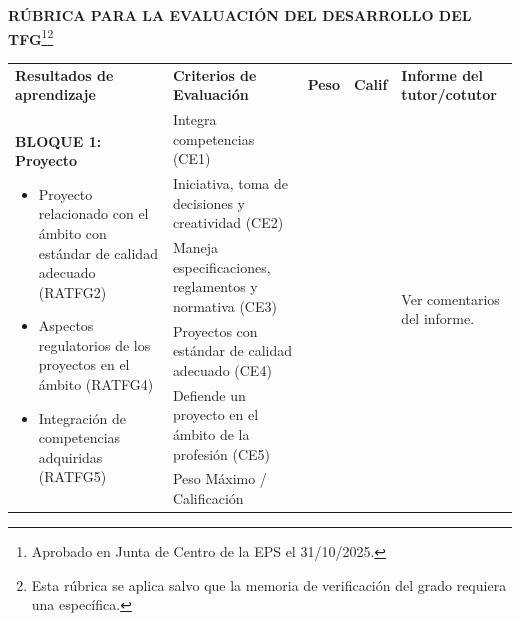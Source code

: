 %
%

\begin{landscape}
\thispagestyle{plain}
\noindent \textbf{RÚBRICA PARA LA EVALUACIÓN DEL DESARROLLO DEL TFG}\footnote{Aprobado en Junta de Centro de la EPS el 31/10/2025.}\footnote{Esta rúbrica se aplica salvo que la memoria de verificación del grado requiera una específica.}
\renewcommand{\arraystretch}{1.3} %

\begin{table}[ht]
  \centering
  \small
\begin{tabularx}{\linewidth}{|p{7cm}|p{9cm}|p{1cm}|p{1cm}|p{5cm}|}
\cline{1-5}
\textbf{Resultados de aprendizaje} & \textbf{Criterios de Evaluación} & \textbf{Peso} & \textbf{Calif} & \textbf{Informe del tutor/cotutor} \\ \cline{1-5}
  \multirow{7}{=}{%
  \begin{minipage}[t]{7cm}
    \textbf{BLOQUE 1: Proyecto}
    \begin{itemize}[left=5pt, itemsep=1pt, topsep=1pt]
      \item Proyecto relacionado con el ámbito con estándar de calidad adecuado (RATFG2)
      \item Aspectos regulatorios de los proyectos en el ámbito (RATFG4)
      \item Integración de competencias adquiridas (RATFG5)
    \end{itemize}
  \end{minipage}}
    & Integra competencias (CE1) &  &  & \multirow[c]{7}{=}{\centering \footnotesize Ver comentarios del informe.} \\ \cline{2-4}
    & Iniciativa, toma de decisiones y creatividad (CE2) &  &  &  \\ \cline{2-4}
    & Maneja especificaciones, reglamentos y normativa (CE3) &  &  &  \\ \cline{2-4}
    & Proyectos con estándar de calidad adecuado (CE4) &  &  &  \\ \cline{2-4}
    & Defiende un proyecto en el ámbito de la profesión (CE5) &  &  &  \\ \cline{2-4}
    & \cellcolor[HTML]{C0C0C0}Peso Máximo / Calificación & \multirow[c]{2}{=}{\centering 3} &  &  \\

\end{tabularx}
\end{table}
\end{landscape}
